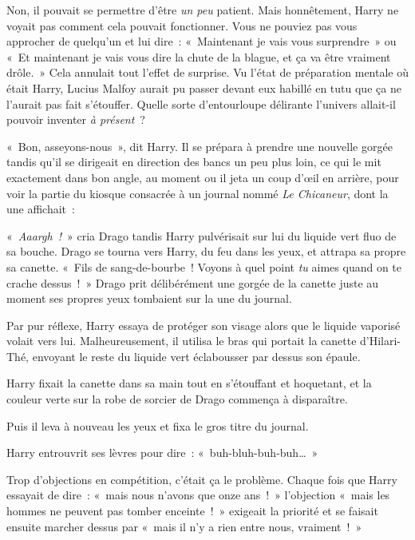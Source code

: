 Non, il pouvait se permettre d'être \emph{un peu} patient.
Mais honnêtement, Harry ne voyait pas comment cela pouvait fonctionner.
Vous ne pouviez pas vous approcher de quelqu'un et lui dire~: «~Maintenant je vais vous surprendre~» ou «~Et maintenant je vais vous dire la chute de la blague, et ça va être vraiment drôle.~»
Cela annulait tout l'effet de surprise.
Vu l'état de préparation mentale où était Harry, Lucius Malfoy aurait pu passer devant eux habillé en tutu que ça ne l'aurait pas fait s'étouffer.
Quelle sorte d'entourloupe délirante l'univers allait-il pouvoir inventer \emph{à présent}~?

«~Bon, asseyons-nous~», dit Harry.
Il se prépara à prendre une nouvelle gorgée tandis qu'il se dirigeait en direction des bancs un peu plus loin, ce qui le mit exactement dans bon angle, au moment ou il jeta un coup d'œil en arrière, pour voir la partie du kiosque consacrée à un journal nommé \emph{Le Chicaneur}, dont la une affichait~:


«~\emph{Aaargh~!}~» cria Drago tandis Harry pulvérisait sur lui du liquide vert fluo de sa bouche.
Drago se tourna vers Harry, du feu dans les yeux, et attrapa sa propre sa canette.
«~Fils de sang-de-bourbe~! Voyons à quel point \emph{tu} aimes quand on te crache dessus~!~»
Drago prit délibérément une gorgée de la canette juste au moment ses propres yeux tombaient sur la une du journal.

Par pur réflexe, Harry essaya de protéger son visage alors que le liquide vaporisé volait vers lui.
Malheureusement, il utilisa le bras qui portait la canette d'Hilari-Thé, envoyant le reste du liquide vert éclabousser par dessus son épaule.

Harry fixait la canette dans sa main tout en s'étouffant et hoquetant, et la couleur verte sur la robe de sorcier de Drago commença à disparaître.

Puis il leva à nouveau les yeux et fixa le gros titre du journal.


Harry entrouvrit ses lèvres pour dire~: «~buh-bluh-buh-buh…~»

Trop d'objections en compétition, c'était ça le problème.
Chaque fois que Harry essayait de dire~: «~mais nous n'avons que onze ans~!~» l'objection «~mais les hommes ne peuvent pas tomber enceinte~!~» exigeait la priorité et se faisait ensuite marcher dessus par «~mais il n'y a rien entre nous, vraiment~!~»

